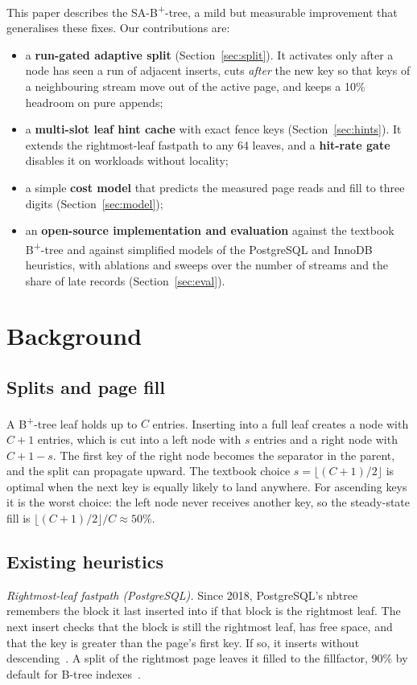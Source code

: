 \documentclass[conference]{IEEEtran}
\newcommand{\sab}{SA-B\textsuperscript{+}-tree}
\newcommand{\bp}{B\textsuperscript{+}-tree}
\begin{document}
This paper describes the \sab, a mild but measurable improvement that
generalises these fixes. Our contributions are:
\begin{itemize}
\item a \textbf{run-gated adaptive split} (Section~\ref{sec:split}). It
  activates only after a node has seen a run of adjacent inserts, cuts
  \emph{after} the new key so that keys of a neighbouring stream move out of
  the active page, and keeps a 10\% headroom on pure appends;
\item a \textbf{multi-slot leaf hint cache} with exact fence keys
  (Section~\ref{sec:hints}). It extends the rightmost-leaf fastpath to any 64
  leaves, and a \textbf{hit-rate gate} disables it on workloads without
  locality;
\item a simple \textbf{cost model} that predicts the measured page reads and
  fill to three digits (Section~\ref{sec:model});
\item an \textbf{open-source implementation and evaluation} against the
  textbook \bp{} and against simplified models of the PostgreSQL and InnoDB
  heuristics, with ablations and sweeps over the number of streams and the
  share of late records (Section~\ref{sec:eval}).
\end{itemize}

\section{Background}
\label{sec:background}

\subsection{Splits and page fill}
A \bp{} leaf holds up to $C$ entries. Inserting into a full leaf creates a
node with $C+1$ entries, which is cut into a left node with $s$ entries and a
right node with $C+1-s$. The first key of the right node becomes the
separator in the parent, and the split can propagate upward. The textbook
choice $s=\lfloor (C+1)/2 \rfloor$ is optimal when the next key is equally
likely to land anywhere. For ascending keys it is the worst choice: the left
node never receives another key, so the steady-state fill is
$\lfloor (C+1)/2\rfloor / C \approx 50\%$.

\subsection{Existing heuristics}
\emph{Rightmost-leaf fastpath (PostgreSQL).} Since 2018, PostgreSQL's nbtree
remembers the block it last inserted into if that block is the rightmost leaf.
The next insert checks that the block is still the rightmost leaf, has free
space, and that the key is greater than the page's first key. If so, it
inserts without descending~\cite{pgfastpath}. A split of the rightmost page
leaves it filled to the fillfactor, 90\% by default for B-tree
indexes~\cite{pgfillfactor}.
\end{document}
